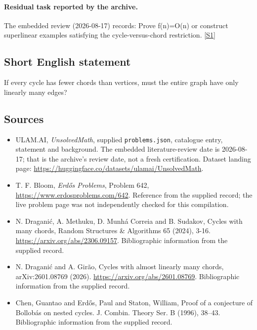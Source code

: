 \documentclass[11pt,a4paper]{article}
\newcommand{\sref}[2]{\hyperlink{source:#1:#2}{[S#2]}}
\begin{document}
\paragraph{Residual task reported by the archive.}

The embedded review (2026-08-17) records: Prove f(n)=O(n) or construct superlinear examples satisfying the cycle-versus-chord restriction. \sref{statement}{1}

\subsection{Short English statement}

If every cycle has fewer chords than vertices, must the entire graph have only linearly many edges?

\subsection{Sources}

{\small

\begin{itemize}

\item[\hypertarget{source:statement:1}{S1}] ULAM.AI, \emph{UnsolvedMath}, supplied \texttt{problems.json}, catalogue entry, statement and background. The embedded literature-review date is 2026-08-17; that is the archive’s review date, not a fresh certification. Dataset landing page: \url{https://huggingface.co/datasets/ulamai/UnsolvedMath}.

\item[\hypertarget{source:statement:2}{S2}] T. F. Bloom, \emph{Erdős Problems}, Problem 642, \url{https://www.erdosproblems.com/642}. Reference from the supplied record; the live problem page was not independently checked for this compilation.

\item[\hypertarget{source:statement:3}{S3}] N. Draganić, A. Methuku, D. Munhá Correia and B. Sudakov, Cycles with many chords, Random Structures \& Algorithms 65 (2024), 3-16. \url{https://arxiv.org/abs/2306.09157}. Bibliographic information from the supplied record.

\item[\hypertarget{source:statement:4}{S4}] N. Draganić and A. Girão, Cycles with almost linearly many chords, arXiv:2601.08769 (2026). \url{https://arxiv.org/abs/2601.08769}. Bibliographic information from the supplied record.

\item[\hypertarget{source:statement:5}{S5}] Chen, Guantao and Erd\H{o}s, Paul and Staton, William, Proof of a conjecture of {B}ollob\'as on nested cycles. J. Combin. Theory Ser. B (1996), 38--43. Bibliographic information from the supplied record.

\end{itemize}

}

\label{end:statement}
\end{document}

